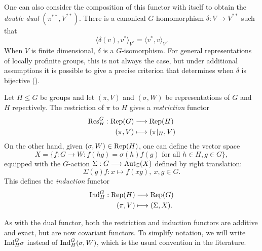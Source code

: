 One can also consider the composition of this functor with itself to obtain the \textit{double dual} $(\pi^{**},V^{**})$. There is a canonical $G$-homomorphism $\delta:V\rightarrow V^{**}$ such that $$\langle\delta(v),v^*\rangle_{V^*}=\langle v^*,v\rangle_{V}.$$
When $V$ is finite dimensional, $\delta$ is a $G$-isomorphism. For general representations of locally profinite groups, this is not always the case, but under additional assumptions it is possible to give a precise criterion that determines when $\delta$ is bijective (\cite[Corollary 2.8, Proposition 2.9]{BH1}).


\begin{defn}
    Let $H\leq G$ be groups and let $(\pi,V)$ and $(\sigma,W)$ be representations of $G$ and $H$ repectively. The restriction of $\pi$ to $H$ gives a \textit{restriction} functor
    \begin{align*}
        \mathrm{Res}_H^G:\mathrm{Rep}(G)&\longrightarrow\mathrm{Rep}(H)\\
        (\pi,V)&\longmapsto(\pi|_H,V)
    \end{align*}
    On the other hand, given $(\sigma,W)\in\mathrm{Rep}(H)$, one can define the vector space
    $$X=\{f:G\to W:f(hg)=\sigma(h)f(g)\text{ for all }h\in H, g\in G\},$$
    equipped with the $G$-action $\Sigma:G\longrightarrow\mathrm{Aut}_{\mathbb{C}}(X)$ defined by right translation:
    $$\Sigma(g)f:x\longmapsto f(xg),\ x,g\in G.$$
    This defines the \textit{induction} functor
    \begin{align*}
        \mathrm{Ind}_H^G:\mathrm{Rep}(H)&\longrightarrow\mathrm{Rep}(G)\\
        (\pi,V)&\longmapsto(\Sigma,X).
    \end{align*}
\end{defn}

As with the dual functor, both the restriction and induction functors are additive and exact, but are now covariant functors. To simplify notation, we will write $\mathrm{Ind}_H^G\sigma$ instead of $\mathrm{Ind}_H^G(\sigma,W)$, which is the usual convention in the literature.

